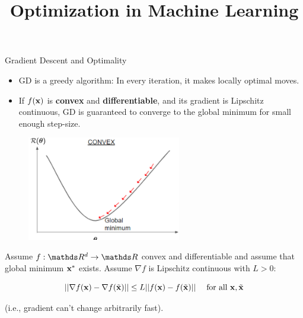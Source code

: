 \documentclass[11pt,compress,t,notes=noshow, xcolor=table]{beamer}
\title{Optimization in Machine Learning}
\date{}
\begin{document}
\sloppy
	
	\begin{vbframe}{Gradient Descent and Optimality}
	
	\begin{itemize}
		\item GD is a greedy algorithm: In every iteration, it makes locally optimal moves.
		\vspace*{0.5mm}
		\item If $f(\mathbf{x})$ is \textbf{convex} and \textbf{differentiable}, and its gradient is Lipschitz continuous, GD is guaranteed to converge to the global minimum for small enough step-size.  
	\end{itemize}
	
	\begin{figure}
		\centering
		\includegraphics[width=0.6\textwidth]{figure_man/gdes_1.png}
	\end{figure}



\framebreak
	
	Assume $f: \R^d \rightarrow \R$ convex and differentiable and assume that global minimum $\mathbf{x}^\ast$ exists. Assume $\nabla f$ is Lipschitz continuous with $L > 0$: 

	\begin{equation*}
	|| \nabla f(\mathbf{x}) - \nabla f(\tilde{\mathbf{x}}) || \le L ||f(\mathbf{x}) - f(\tilde{\mathbf{x}}) || \quad \text{ for all } \mathbf{x}, \tilde{\mathbf{x}}
	\end{equation*}
	
	(i.e., gradient can't change arbitrarily fast).
		

\end{vbframe}
\end{document}
